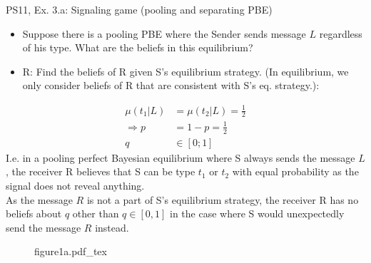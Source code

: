 \begin{frame}{PS11, Ex. 3.a: Signaling game (pooling and separating PBE)}
    \begin{itemize}
      \item[(a)] Suppose there is a pooling PBE where the Sender sends message $L$ regardless of his type. What are the beliefs in this equilibrium?
    \end{itemize} \vspace{-8pt}
    \begin{multicols}{2}
      \begin{itemize}
        \item[SR3:] R: Find the beliefs of R given S's equilibrium strategy. (In equilibrium, we only consider beliefs of R that are consistent with S's eq. strategy.):
      \end{itemize}\vspace{-4pt}
      \begin{align*}
        \mu(t_1|L)&=\mu(t_2|L)=\frac{1}{2}\\
        \Rightarrow p&=1-p=\frac{1}{2}\\
        q&\in[0;1]
      \end{align*}
      I.e. in a pooling perfect Bayesian equilibrium where S always sends the message $L$, the receiver R believes that S can be type $t_1$ or $t_2$ with equal probability as the signal does not reveal anything.\\\medskip
      As the message $R$ is not a part of S's equilibrium strategy, the receiver R has no beliefs about $q$ other than $q\in[0,1]$ in the case where S would unexpectedly send the message $R$ instead.
      \vfill\null\columnbreak
      \begin{figure}[!h]
        \center\def\svgwidth{\columnwidth}
        {figure1a.pdf_tex}
      \end{figure}
      \vfill\null \columnbreak
      \vfill
    \end{multicols}
\end{frame}


